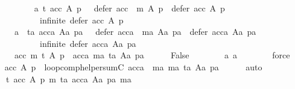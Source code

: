 \begin{isabellebody}
\ \ \ \ \isamarkupfalse%
\isanewline
\ \ \ \ \ \ a{}{\isacharcolon}{\kern0pt}\ {\isachardoublequoteopen}t\ {\isacharparenleft}{\kern0pt}acc\ A\ p{\isacharparenright}{\kern0pt}\ {\isasymor}\ {\isasymnot}\ defer\ {\isacharparenleft}{\kern0pt}acc\ {\isasymtriangleright}\ m{\isacharparenright}{\kern0pt}\ A\ p\ {\isasymsubset}\ defer\ acc\ A\ p\ {\isasymor}\isanewline
\ \ \ \ \ \ \ \ \ \ \ \ infinite\ {\isacharparenleft}{\kern0pt}defer\ acc\ A\ p{\isacharparenright}{\kern0pt}{\isachardoublequoteclose}\ \isanewline
\ \ \ \ \ \ a{}{\isacharcolon}{\kern0pt}\ {\isachardoublequoteopen}{\isasymnot}\ {\isacharparenleft}{\kern0pt}ta\ {\isacharparenleft}{\kern0pt}acca\ Aa\ pa{\isacharparenright}{\kern0pt}\ {\isasymor}\ {\isasymnot}\ defer\ {\isacharparenleft}{\kern0pt}acca\ {\isasymtriangleright}\ ma{\isacharparenright}{\kern0pt}\ Aa\ pa\ {\isasymsubset}\ defer\ acca\ Aa\ pa\ {\isasymor}\isanewline
\ \ \ \ \ \ \ \ \ \ \ \ infinite\ {\isacharparenleft}{\kern0pt}defer\ acca\ Aa\ pa{\isacharparenright}{\kern0pt}{\isacharparenright}{\kern0pt}{\isachardoublequoteclose}\ \isanewline
\ \ \ \ \ \ {\isachardoublequoteopen}{\isacharparenleft}{\kern0pt}acc{\isacharcomma}{\kern0pt}\ m{\isacharcomma}{\kern0pt}\ t{\isacharcomma}{\kern0pt}\ A{\isacharcomma}{\kern0pt}\ p{\isacharparenright}{\kern0pt}\ {\isacharequal}{\kern0pt}\ {\isacharparenleft}{\kern0pt}acca{\isacharcomma}{\kern0pt}\ ma{\isacharcomma}{\kern0pt}\ ta{\isacharcomma}{\kern0pt}\ Aa{\isacharcomma}{\kern0pt}\ pa{\isacharparenright}{\kern0pt}{\isachardoublequoteclose}\isanewline
\ \ \ \ \isamarkupfalse%
\ False\isanewline
\ \ \ \ \ \ \isamarkupfalse%
\ a{}\ a{}\isanewline
\ \ \ \ \ \ \isamarkupfalse%
\ force\isanewline
\ \ \isamarkupfalse%
\ {\isachardoublequoteopen}acc\ A\ p\ {\isacharequal}{\kern0pt}\ loop{\isacharunderscore}{\kern0pt}comp{\isacharunderscore}{\kern0pt}helper{\isacharunderscore}{\kern0pt}sumC\ {\isacharparenleft}{\kern0pt}acca\ {\isasymtriangleright}\ ma{\isacharcomma}{\kern0pt}\ ma{\isacharcomma}{\kern0pt}\ ta{\isacharcomma}{\kern0pt}\ Aa{\isacharcomma}{\kern0pt}\ pa{\isacharparenright}{\kern0pt}{\isachardoublequoteclose}\isanewline
\ \ \ \ \isamarkupfalse%
\ auto\isanewline
{}\isamarkupfalse%
\isanewline
{}\isamarkupfalse%
\isanewline
\ \ \isamarkupfalse%
\isanewline
\ \ \ \ {\isachardoublequoteopen}{\isasymAnd}t\ acc\ A\ p\ m\ ta\ acca\ Aa\ pa\ ma{\isachardot}{\kern0pt}\isanewline

\end{isabellebody}
